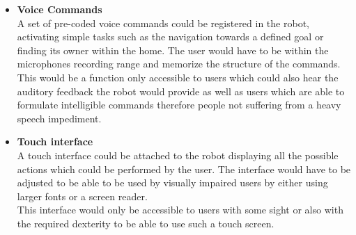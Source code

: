 \documentclass[plainarticle,zihtitle,english,final,hyperref,utf8]{zihpub}
\begin{document}
\begin{itemize}
    \item \textbf{Voice Commands}\\
    A set of pre-coded voice commands could be registered in the robot, activating simple tasks such as the navigation towards a defined goal or finding its owner within the home. The user would have to be within the microphones recording range and memorize the structure of the commands.\\
    \newline
    This would be a function only accessible to users which could also hear the auditory feedback the robot would provide as well as users which are able to formulate intelligible commands therefore people not suffering from a heavy speech impediment. \\
    \item \textbf{Touch interface}\\
    A touch interface could be attached to the robot displaying all the possible actions which could be performed by the user. The interface would have to be adjusted to be able to be used by visually impaired users by either using larger fonts or a screen reader.\\
    \newline
    This interface would only be accessible to users with some sight or also with the required dexterity to be able to use such a touch screen.
\end{itemize}
\end{document}

